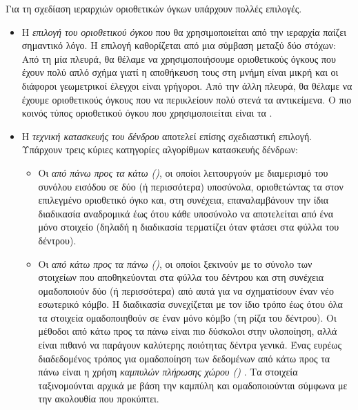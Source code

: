 Για τη σχεδίαση ιεραρχιών οριοθετικών όγκων υπάρχουν πολλές επιλογές. 
\begin{itemize}
    \item Η \textit{επιλογή του οριοθετικού όγκου} 
    που θα χρησιμοποιείται από την ιεραρχία παίζει σημαντικό λόγο. 
    Η επιλογή καθορίζεται από μια σύμβαση μεταξύ δύο στόχων: 
    Από τη μία πλευρά, θα θέλαμε να χρησιμοποιήσουμε
    οριοθετικούς όγκους που έχουν πολύ απλό σχήμα γιατί η αποθήκευση τους 
    στη μνήμη είναι μικρή και οι διάφοροι γεωμετρικοί έλεγχοι είναι 
    γρήγοροι.
    Από την άλλη πλευρά, θα θέλαμε να έχουμε οριοθετικούς όγκους που να
    περικλείουν πολύ στενά τα αντικείμενα.
    Ο πιο κοινός τύπος οριοθετικού όγκου που χρησιμοποιείται είναι τα
    .
    
    \item Η \textit{τεχνική κατασκευής του δένδρου} αποτελεί επίσης 
    σχεδιαστική επιλογή.
    Υπάρχουν τρεις κύριες κατηγορίες αλγορίθμων κατασκευής δένδρων: 
    \begin{itemize}
        \item Οι \textit{από πάνω προς τα κάτω ()}, οι 
        οποίοι λειτουργούν με διαμερισμό του συνόλου εισόδου σε δύο (ή περισσότερα)
        υποσύνολα, οριοθετώντας τα στον επιλεγμένο 
        οριοθετικό όγκο και, στη συνέχεια, επαναλαμβάνουν την ίδια 
        διαδικασία αναδρομικά έως ότου κάθε υποσύνολο να αποτελείται 
        από ένα μόνο στοιχείο (δηλαδή η διαδικασία τερματίζει 
        όταν φτάσει στα φύλλα του δέντρου).
        
        \item Οι \textit{από κάτω προς τα πάνω ()}, οι
        οποίοι ξεκινούν με το σύνολο των στοιχείων που αποθηκεύονται 
        στα φύλλα του δέντρου και στη συνέχεια ομαδοποιούν δύο (ή περισσότερα) 
        από αυτά για να σχηματίσουν έναν νέο εσωτερικό κόμβο.
        Η διαδικασία συνεχίζεται με τον ίδιο τρόπο έως ότου όλα 
        τα στοιχεία ομαδοποιηθούν σε έναν μόνο κόμβο (τη ρίζα του δέντρου).
        Οι μέθοδοι από κάτω προς τα πάνω είναι πιο δύσκολοι στην υλοποίηση, 
        αλλά είναι πιθανό να παράγουν καλύτερης ποιότητας δέντρα γενικά.
        Ένας ευρέως διαδεδομένος τρόπος για ομαδοποίηση των δεδομένων από κάτω 
        προς τα πάνω είναι η χρήση \textit{καμπυλών πλήρωσης χώρου
        ()} \cite{gu2013efficient} \cite{tero2012construct}. 
        Τα στοιχεία ταξινομούνται αρχικά με βάση την καμπύλη και 
        ομαδοποιούνται σύμφωνα με την ακολουθία που προκύπτει.
        

\end{itemize}
\end{itemize}
